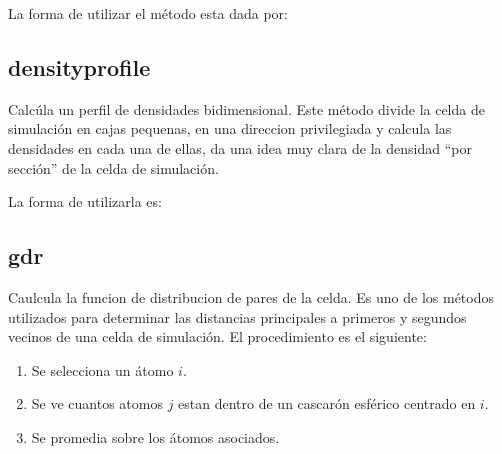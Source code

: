 La forma de utilizar el m\'etodo esta dada por:


\subsection{densityprofile}
Calc\'ula un perfil de densidades bidimensional. Este m\'etodo divide la celda de simulaci\'on en cajas pequenas, en una direccion privilegiada y calcula las densidades en cada una de ellas, da una idea muy clara de la densidad ``por secci\'on'' de la celda de simulaci\'on.

La forma de utilizarla es:



\subsection{gdr}
Caulcula la funcion de distribucion de pares de la celda. Es uno de los m\'etodos utilizados para determinar las distancias principales a primeros y segundos vecinos de una celda de simulaci\'on. El procedimiento es el siguiente:
\begin{enumerate}
 \item Se selecciona un \'atomo $i$.
 \item Se ve cuantos atomos $j$ estan dentro de un cascar\'on esf\'erico centrado en $i$.
 \item Se promedia sobre los \'atomos asociados.
\end{enumerate}

